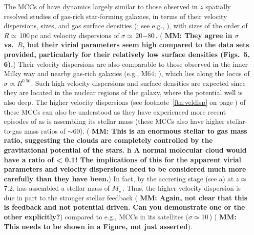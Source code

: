 \IfFileExists{emulateapjlegacy.cls}{\documentclass[iop]{emulateapjlegacy}}{\documentclass[iop]{emulateapj}}
\newcommand{\MM}[1]{({\bf \color{mmcolor} MM: #1})}
\begin{document}
The MCCs of \flower have dynamics largely similar to those observed in
$z$ spatially resolved studies of gas-rich star-forming
galaxies, in terms of their velocity dispersions, sizes, and gas
surface densities (; see e.g.,
\citealt{Swinbank11a}), with sizes of the order of $R\simeq$\,100\,pc
and velocity dispersions of $\sigma\simeq$\,20$-$80\,\kms. 
\MM{They agree in $\sigma$ vs.\ $R$, but their virial parameters seem
  high compared to the data sets provided, particularly for their
  relatively low surface densities (Figs.\ 5, 6).}
%
%
Their velocity dispersions are also comparable to those observed in the inner Milky way and nearby gas-rich galaxies (e.g., M64; \citealt{Oka01a, Rosolowsky05a, Heyer09a}), which lies along the locus of $\sigma\propto R^{0.56}$. Such high velocity dispersions and surface densities are expected since they are located in the nuclear regions of the galaxy, where the potential well is also deep. The higher velocity dispersions
(see footnote~\ref{ftn:veldisp} on page \pageref{ftn:veldisp}) of
these MCCs can also be understood as they have experienced more recent
episodes of \SF as \flower is assembling its stellar mass (these MCCs
also have higher stellar-to-gas mass ratios of $\sim$60). \MM{This is
  an enormous stellar to gas mass ratio, suggesting the clouds are
  completely controlled by the gravitational potential of the stars.
h  A normal molecular cloud would have a ratio of < 0.1!  The
  implications of this for the apparent virial parameters and velocity
dispersions need to be considered much more carefully than they have been.}
%
In fact, by the accreting stage (see a) at $z\simeq$\,7.2, 
\flower has assembled a stellar mass of
$M_\star$\,\Msun. Thus, the higher velocity dispersion is
due in part to the stronger stellar feedback \MM{Again, not clear that
  this is feedback and not potential driven. Can you demonstrate one
  or the other explicitly?} compared to e.g., MCCs in
its satellites ($\sigma\simeq$10\,\kms) \MM{This needs to be shown in
  a Figure, not just asserted}.
\end{document}
